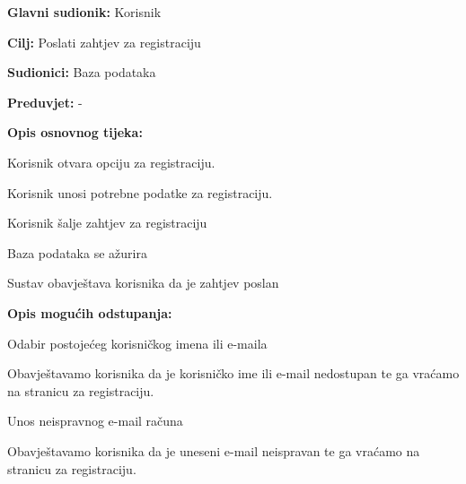 				
				\noindent {}
				\begin{packed_item}
					
					\item \textbf{Glavni sudionik: }Korisnik
					\item  \textbf{Cilj:} Poslati zahtjev za registraciju
					\item  \textbf{Sudionici:} Baza podataka
					\item  \textbf{Preduvjet:} -
					\item  \textbf{Opis osnovnog tijeka:}
					
					\item[] \begin{packed_enum}
						
						\item Korisnik otvara opciju za registraciju.
						\item Korisnik unosi potrebne podatke za registraciju.
						\item Korisnik šalje zahtjev za registraciju
						\item Baza podataka se ažurira
						\item Sustav obavještava korisnika da je zahtjev poslan
						
					\end{packed_enum}
					
					\item  \textbf{Opis mogućih odstupanja:}
					
					\item[] \begin{packed_item}
						
						\item[2.a] Odabir postojećeg korisničkog imena ili e-maila
						\item[] \begin{packed_enum}
							
							\item Obavještavamo korisnika da je korisničko ime ili e-mail nedostupan te ga vraćamo na stranicu za registraciju.
						\end{packed_enum}
							
						\item[2.b] Unos neispravnog e-mail računa
						\item[] \begin{packed_enum}
							
							\item Obavještavamo korisnika da je uneseni e-mail neispravan te ga vraćamo na stranicu za registraciju.\\						
						\end{packed_enum}
					\end{packed_item}
				\end{packed_item}
			

